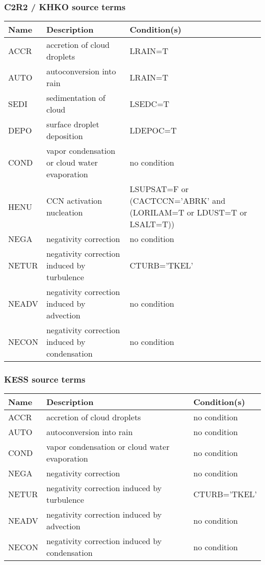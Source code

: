 \subsubsection{C2R2 / KHKO source terms}

\begin{longtable} {|p{}|p{}|p{}|}
\hline
Name & Description & Condition(s) \\
\hline \hline
\endhead
ACCR   & accretion of cloud droplets                   & LRAIN=T \\\hline
AUTO   & autoconversion into rain                      & LRAIN=T \\\hline
SEDI   & sedimentation of cloud                        & LSEDC=T \\\hline
DEPO   & surface droplet deposition                    & LDEPOC=T \\\hline
COND   & vapor condensation or cloud water evaporation & no condition \\\hline
HENU   & CCN activation nucleation                     & LSUPSAT=F or (CACTCCN='ABRK' and (LORILAM=T or LDUST=T or LSALT=T)) \\\hline
NEGA   & negativity correction                         & no condition \\\hline
NETUR  & negativity correction induced by turbulence   & CTURB='TKEL' \\\hline
NEADV  & negativity correction induced by advection    & no condition \\\hline
NECON  & negativity correction induced by condensation & no condition \\\hline
\end{longtable}

\subsubsection{KESS source terms}

\begin{longtable} {|p{}|p{}|p{}|}
\hline
Name & Description & Condition(s) \\
\hline \hline
\endhead
ACCR   & accretion of cloud droplets                   & no condition \\\hline
AUTO   & autoconversion into rain                      & no condition \\\hline
COND   & vapor condensation or cloud water evaporation & no condition \\\hline
NEGA   & negativity correction                         & no condition \\\hline
NETUR  & negativity correction induced by turbulence   & CTURB='TKEL' \\\hline
NEADV  & negativity correction induced by advection    & no condition \\\hline
NECON  & negativity correction induced by condensation & no condition \\\hline
\end{longtable}

